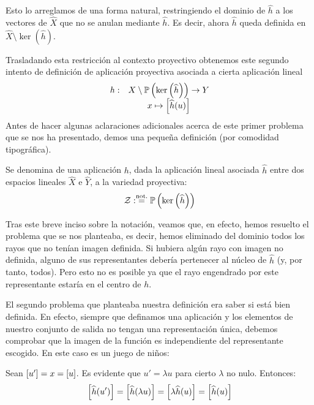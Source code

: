 Esto lo arreglamos de una forma natural, restringiendo el dominio de $\widehat{h}$ a los vectores de $\widehat{X}$ que no se anulan mediante $\widehat{h}$. Es decir, ahora $\widehat{h}$ queda definida en $\widehat{X}\setminus \ker\left(\widehat{h}\right)$.

Trasladando esta restricción al contexto proyectivo obtenemos este segundo intento de definición de aplicación proyectiva asociada a cierta aplicación lineal
\[\begin{array}{cc}
h:&X\setminus\mathbb{P}\left(\ker\left(\widehat{h}\right)\right)\to Y\\
&x\mapsto\left [ \widehat{h}(u) \right ]
\end{array}\]
Antes de hacer algunas aclaraciones adicionales acerca de este primer problema que se nos ha presentado, demos una pequeña definición (por comodidad tipográfica).
\begin{defi}[Centro]
	\label{C4_def_centro}
	Se denomina  de una aplicación $h$, dada la aplicación lineal asociada $\widehat{h}$ entre dos espacios lineales $\widehat{X}$ e $\widehat{Y}$, a la variedad proyectiva:
	\[\mathcal{Z}:\stackrel{\textrm{not.}}{=}\mathbb{P}\left(\ker\left(\widehat{h}\right)\right)\]
\end{defi}
Tras este breve inciso sobre la notación, veamos que, en efecto, hemos resuelto el problema que se nos planteaba, es decir, hemos eliminado del dominio todos los rayos que no tenían imagen definida. Si hubiera algún rayo con imagen no definida, alguno de sus representantes debería pertenecer al núcleo de $\widehat{h}$ (y, por tanto, todos). Pero esto no es posible ya que el rayo engendrado por este representante estaría en el centro de $h$.

El segundo problema que planteaba nuestra definición era saber si está bien definida. En efecto, siempre que definamos una aplicación y los elementos de nuestro conjunto de salida no tengan una representación única, debemos comprobar que la imagen de la función es independiente del representante escogido. En este caso es un juego de niños:

Sean $\left [ u' \right ]=x=\left [ u \right ]$. Es evidente que $u' = \lambda u$ para cierto $\lambda$ no nulo. Entonces:
\[\left [ \widehat{h}(u') \right ]=\left [ \widehat{h}(\lambda u) \right ]=\left [ \lambda\widehat{h}(u) \right ]=\left [ \widehat{h}(u) \right ]\]


